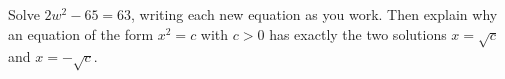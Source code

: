 Solve $2w^2-65=63$, writing each new equation as you work. Then explain why an equation of the form $x^2=c$ with $c>0$ has exactly the two solutions $x=\sqrt c$ and $x=-\sqrt c$.
